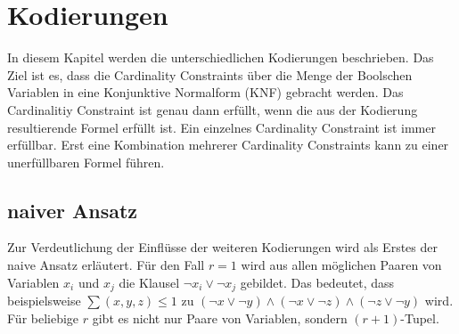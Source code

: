 \documentclass[a4,abstract=on]{scrartcl}
\newcommand*\stdsection{}
\let\stdsection\section
\renewcommand*\section{%
    \clearpage\ifodd\value{page}\else\mbox{}\clearpage\fi
    \stdsection}
\begin{document}
\section{Kodierungen}
In diesem Kapitel werden die unterschiedlichen Kodierungen beschrieben. Das Ziel ist es, dass die Cardinality Constraints über die Menge der Boolschen Variablen in eine Konjunktive Normalform (KNF) gebracht werden. %
Das Cardinalitiy Constraint ist genau dann erfüllt, wenn die aus der Kodierung resultierende Formel erfüllt ist. Ein einzelnes Cardinality Constraint ist immer erfüllbar. Erst eine Kombination mehrerer Cardinality Constraints kann zu einer unerfüllbaren Formel führen.


	\subsection{naiver Ansatz}
Zur Verdeutlichung der Einflüsse der weiteren Kodierungen wird als Erstes der naive Ansatz erläutert. Für den Fall $r=1$ wird aus allen möglichen Paaren von Variablen $x_i$ und $x_j$ die Klausel $\neg x_i \vee \neg x_j$ gebildet. Das bedeutet, dass beispielsweise $\sum(x,y,z)\leq1$ zu $(\neg x \vee \neg y) \wedge (\neg x \vee \neg z) \wedge (\neg z \vee \neg y)$ wird.
Für beliebige $r$ gibt es nicht nur Paare von Variablen, sondern $(r+1)$-Tupel.
\end{document}
